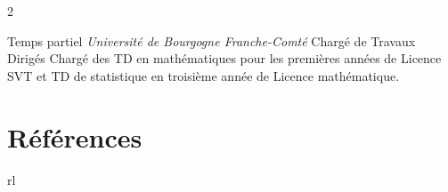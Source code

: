 \documentclass[10pt]{article} %
\begin{document}
\begin{paracol}{2}

{Temps partiel} %
{\textit{Université de Bourgogne Franche-Comté}} %
{Chargé de Travaux Dirigés} %
{Chargé des TD en mathématiques pour les premières années de Licence SVT et TD de statistique en troisième année de Licence mathématique. } %


\vspace{-\baselineskip}\medskip %


\section{Références}







\begin{supertabular}{rl} %
	
	


\end{supertabular}
\end{paracol}
\end{document}
